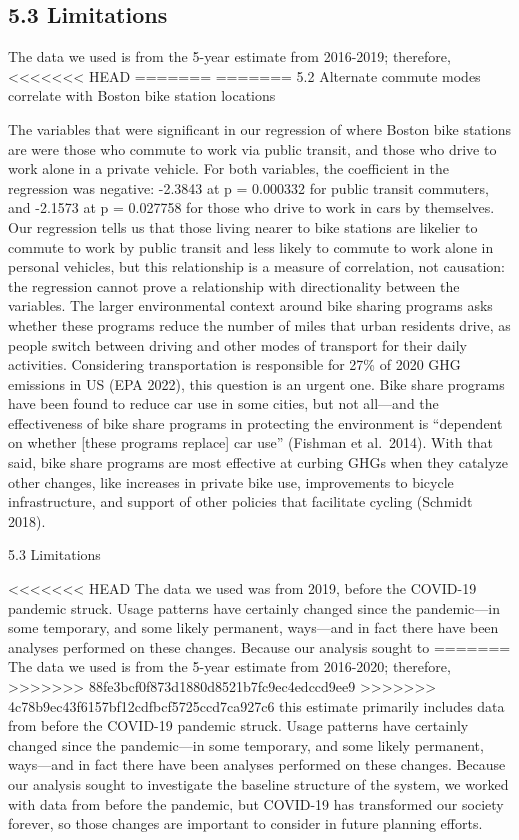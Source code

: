 \documentclass[
  12pt,
]{article}
\begin{document}
\begin{longtable}[]
\hypertarget{limitations}{%
\subsection{5.3 Limitations}\label{limitations}}

The data we used is from the 5-year estimate from 2016-2019; therefore,
<<<<<<< HEAD
=======
=======
5.2 Alternate commute modes correlate with Boston bike station locations

The variables that were significant in our regression of where Boston
bike stations are were those who commute to work via public transit, and
those who drive to work alone in a private vehicle. For both variables,
the coefficient in the regression was negative: -2.3843 at p = 0.000332
for public transit commuters, and -2.1573 at p = 0.027758 for those who
drive to work in cars by themselves. Our regression tells us that those
living nearer to bike stations are likelier to commute to work by public
transit and less likely to commute to work alone in personal vehicles,
but this relationship is a measure of correlation, not causation: the
regression cannot prove a relationship with directionality between the
variables. The larger environmental context around bike sharing programs
asks whether these programs reduce the number of miles that urban
residents drive, as people switch between driving and other modes of
transport for their daily activities. Considering transportation is
responsible for 27\% of 2020 GHG emissions in US (EPA 2022), this
question is an urgent one. Bike share programs have been found to reduce
car use in some cities, but not all---and the effectiveness of bike
share programs in protecting the environment is ``dependent on whether
{[}these programs replace{]} car use'' (Fishman et al.~2014). With that
said, bike share programs are most effective at curbing GHGs when they
catalyze other changes, like increases in private bike use, improvements
to bicycle infrastructure, and support of other policies that facilitate
cycling (Schmidt 2018).

5.3 Limitations

<<<<<<< HEAD
The data we used was from 2019, before the COVID-19 pandemic struck.
Usage patterns have certainly changed since the pandemic---in some
temporary, and some likely permanent, ways---and in fact there have been
analyses performed on these changes. Because our analysis sought to
=======
The data we used is from the 5-year estimate from 2016-2020; therefore,
>>>>>>> 88fe3bcf0f873d1880d8521b7fc9ec4edccd9ee9
>>>>>>> 4c78b9ec43f6157bf12cdfbcf5725ccd7ca927c6
this estimate primarily includes data from before the COVID-19 pandemic
struck. Usage patterns have certainly changed since the pandemic---in
some temporary, and some likely permanent, ways---and in fact there have
been analyses performed on these changes. Because our analysis sought to
investigate the baseline structure of the system, we worked with data
from before the pandemic, but COVID-19 has transformed our society
forever, so those changes are important to consider in future planning
efforts.


\end{longtable}
\end{document}

